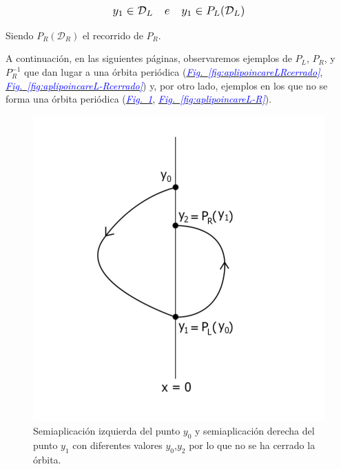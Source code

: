 \documentclass[12pt,a4paper]{report} %
\newcommand{\fref}[1]{\hyperref[#1]{\textcolor{blue}{\textit{Fig.~\ref*{#1}}}}}
\begin{document}
	\begin{equation*}
		\scalebox{1.2}{$\displaystyle
			y_1 \in \mathcal{D}_L \quad e \quad y_1\in P_L(\mathcal{D}_L)
			$}
	\end{equation*}\smallskip
	
	\noindent Siendo $ P_R(\mathcal{D}_R)$ el recorrido de $P_R$.
	
	\vspace{1cm}\noindent A continuación, en las siguientes páginas, observaremos ejemplos de $P_L$, $P_R$, y $P_R^{-1}$ que dan lugar a una órbita periódica (\fref{fig:aplipoincareLRcerrado}, \fref{fig:aplipoincareL-Rcerrado}) y, por otro lado, ejemplos en los que no se forma una órbita periódica (\fref{fig:aplipoincareLR}, \fref{fig:aplipoincareL-R}).
	
	\newpage
	
	 \begin{figure}[h]
		\centering
		\includegraphics[width=1.1\textwidth,center]{aplipoincareLR.jpg}
		\caption{Semiaplicación izquierda del punto $y_0$ y semiaplicación derecha del punto $y_1$ con diferentes valores $y_0$,$y_2$ por lo que no se ha cerrado la órbita.}
		\label{fig:aplipoincareLR}
	\end{figure}\smallskip
	
	\newpage
	
\end{document}
